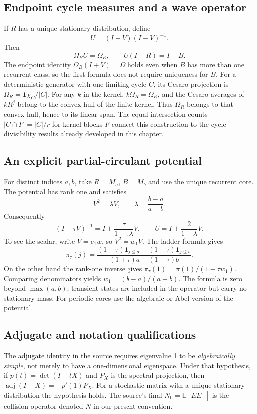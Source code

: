 \subsection{Endpoint cycle measures and a wave operator}
If $R$ has a unique stationary distribution, define
\[
 U=(I+V)(I-V)^{-1}.
\]
Then
\[
 \Omega_B U=\Omega_R,\qquad U(I-R)=I-B.
\]
The endpoint identity $\Omega_B(I+V)=\Omega$ holds even when $B$ has
more than one recurrent class, so the first formula does not require
uniqueness for $B$.
For a deterministic generator with one limiting cycle $C$, its Cesaro
projection is $\Omega_R=\mathbf1\chi_C/|C|$. For any $k$ in the kernel,
$k\Omega_R=\Omega_R$, and the Cesaro averages of $kR^j$ belong to the
convex hull of the finite kernel. Thus $\Omega_R$ belongs to that convex
hull, hence to its linear span. The equal intersection counts
$|C\cap F|=|C|/r$ for kernel blocks $F$ connect this construction to the
cycle-divisibility results already developed in this chapter.

\subsection{An explicit partial-circulant potential}
For distinct indices $a,b$, take $R=M_a$, $B=M_b$ and use the unique
recurrent core. The potential has rank one and satisfies
\[
 V^2=\lambda V,\qquad \lambda=\frac{b-a}{a+b}.
\]
Consequently
\[
 (I-\tau V)^{-1}=I+\frac{\tau}{1-\tau\lambda}V,
 \qquad U=I+\frac{2}{1-\lambda}V.
\]
To see the scalar, write $V=e_1w$, so $V^2=w_1V$. The ladder formula gives
\[
 \pi_\tau(j)=
 \frac{(1+\tau)\mathbf1_{j\le a}+(1-\tau)\mathbf1_{j\le b}}
 {(1+\tau)a+(1-\tau)b}.
\]
On the other hand the rank-one inverse gives
$\pi_\tau(1)=\pi(1)/(1-\tau w_1)$. Comparing denominators yields
$w_1=(b-a)/(a+b)$. The formula is zero beyond $\max(a,b)$; transient
states are included in the operator but carry no stationary mass.
For periodic cores use the algebraic or Abel version of the potential.

\subsection{Adjugate and notation qualifications}
The adjugate identity in the source requires eigenvalue 1 to be
\emph{algebraically simple}, not merely to have a one-dimensional
eigenspace. Under that hypothesis, if $p(t)=\det(I-tX)$ and $P_X$ is the
spectral projection, then $\operatorname{adj}(I-X)=-p'(1)P_X$.
For a stochastic matrix with a unique stationary distribution the
hypothesis holds. The source's final $N_0=\mathbb E[EE^{\mathsf T}]$
is the collision operator denoted $N$ in our present convention.
